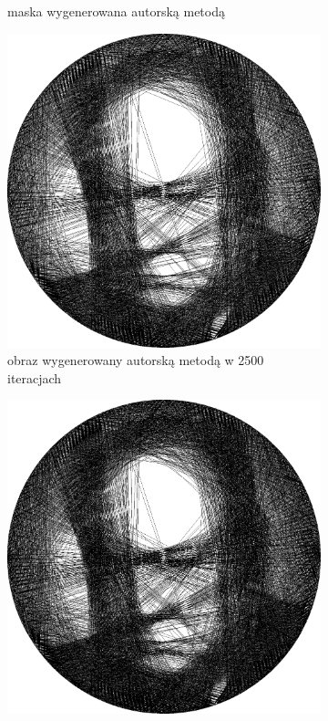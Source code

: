 \begin{figure}[H]
\begin{subfigure}{0.30\textwidth}
        \caption{maska wygenerowana autorską metodą}
        \label{comp-comp-churchill-f}
    \end{subfigure}
    \begin{subfigure}{0.30\textwidth}
        \centering
        \includegraphics[width = \textwidth]{img/6-comp/churchill_e_i2500_c20_inv0_bg1_obj2_ed1.png}
        \caption{obraz wygenerowany autorską metodą w 2500 iteracjach}
        \label{comp-comp-churchill-g}
    \end{subfigure}
    \begin{subfigure}{0.30\textwidth}
        \centering
        \includegraphics[width = \textwidth]{img/6-comp/churchill_e_i3000_c20_inv0_bg1_obj2_ed1.png}

\end{subfigure}
\end{figure}
